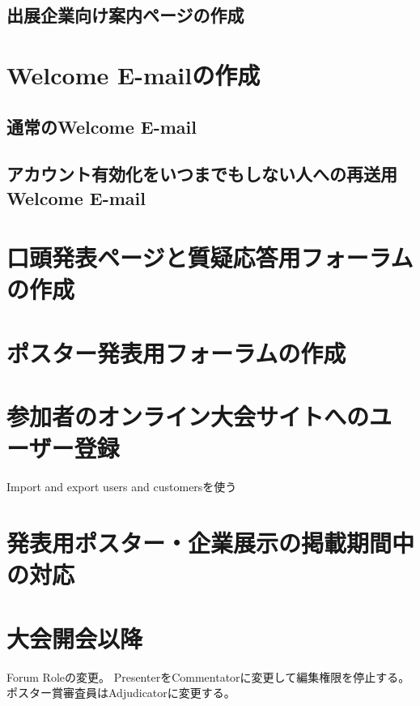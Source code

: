 \documentclass[titlepage,10pt,a4paper,uplatex]{jsbook}
\begin{document}
\subsection{出展企業向け案内ページの作成}

\section{Welcome E-mailの作成}

\subsection{通常のWelcome E-mail}

\subsection{アカウント有効化をいつまでもしない人への再送用Welcome E-mail}

\section{口頭発表ページと質疑応答用フォーラムの作成}

\section{ポスター発表用フォーラムの作成}

\section{参加者のオンライン大会サイトへのユーザー登録}

Import and export users and customersを使う

\section{発表用ポスター・企業展示の掲載期間中の対応}

\section{大会開会以降}

Forum Roleの変更。
PresenterをCommentatorに変更して編集権限を停止する。
ポスター賞審査員はAdjudicatorに変更する。


\end{document}
